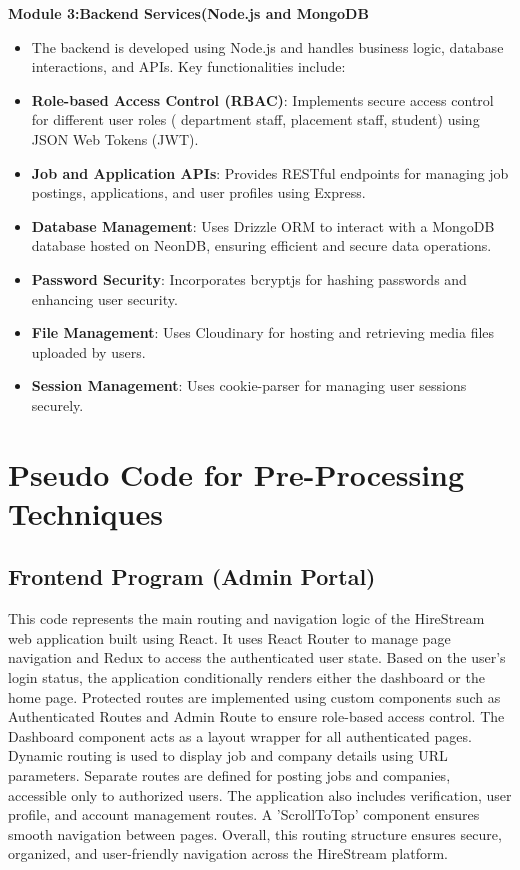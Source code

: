 \documentclass[a4paper, 12pt]{report}
\begin{document}
\noindent \textbf{Module 3:Backend Services(Node.js and MongoDB}
\begin{itemize}[itemsep=-4pt]
    \item The backend is developed using Node.js and handles business logic, database interactions, and APIs. Key functionalities include:
    \item 	\textbf{Role-based Access Control (RBAC)}: Implements secure access control for different user roles ( department staff, placement staff, student) using JSON Web Tokens (JWT).
    \item\textbf{	Job and Application APIs}: Provides RESTful endpoints for managing job postings, applications, and user profiles using Express.
    \item \textbf{Database Management}: Uses Drizzle ORM to interact with a MongoDB database hosted on NeonDB, ensuring efficient and secure data operations.

    \item 	\textbf{Password Security}: Incorporates bcryptjs for hashing passwords and enhancing user security.
    \item \textbf{File Management}: Uses Cloudinary for hosting and retrieving media files uploaded by users.
    \item \textbf{Session Management}: Uses cookie-parser for managing user sessions securely.
\end{itemize}
\section{\textbf{Pseudo Code for Pre-Processing Techniques}}
\subsection{\textbf{Frontend Program (Admin Portal)}}

This code represents the main routing and navigation logic of the HireStream web application built using React. It uses React Router to manage page navigation and Redux to access the authenticated user state. Based on the user’s login status, the application conditionally renders either the dashboard or the home page. Protected routes are implemented using custom components such as Authenticated Routes and Admin Route to ensure role-based access control. The Dashboard component acts as a layout wrapper for all authenticated pages. Dynamic routing is used to display job and company details using URL parameters. Separate routes are defined for posting jobs and companies, accessible only to authorized users. The application also includes verification, user profile, and account management routes. A 'ScrollToTop' component ensures smooth navigation between pages. Overall, this routing structure ensures secure, organized, and user-friendly navigation across the HireStream platform.
\end{document}
